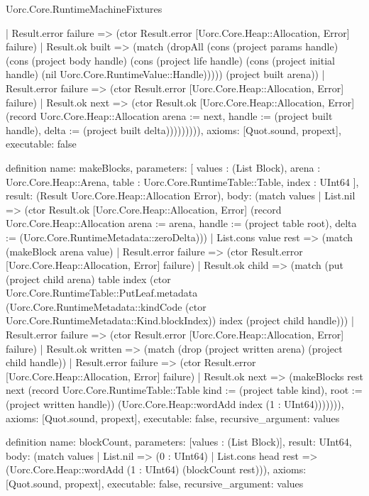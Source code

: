\begin{lexlean}{Uorc.Core.RuntimeMachineFixtures}
\begin{semanticmodule}
{            | Result.error failure => (ctor Result.error [Uorc.Core.Heap::Allocation, Error] failure)
            | Result.ok built => (match (dropAll (cons (project params handle) (cons (project body handle) (cons (project life handle) (cons (project initial handle) (nil Uorc.Core.RuntimeValue::Handle))))) (project built arena))
              | Result.error failure => (ctor Result.error [Uorc.Core.Heap::Allocation, Error] failure)
              | Result.ok next => (ctor Result.ok [Uorc.Core.Heap::Allocation, Error] (record Uorc.Core.Heap::Allocation {arena := next, handle := (project built handle), delta := (project built delta)})))))))),
  axioms: [Quot.sound, propext],
  executable: false
}

definition{
  name: makeBlocks,
  parameters: [
    values : (List Block),
    arena : Uorc.Core.Heap::Arena,
    table : Uorc.Core.RuntimeTable::Table,
    index : UInt64
  ],
  result: (Result Uorc.Core.Heap::Allocation Error),
  body: (match values
    | List.nil => (ctor Result.ok [Uorc.Core.Heap::Allocation, Error] (record Uorc.Core.Heap::Allocation {arena := arena, handle := (project table root), delta := (Uorc.Core.RuntimeMetadata::zeroDelta)}))
    | List.cons value rest => (match (makeBlock arena value)
      | Result.error failure => (ctor Result.error [Uorc.Core.Heap::Allocation, Error] failure)
      | Result.ok child => (match (put (project child arena) table index (ctor Uorc.Core.RuntimeTable::PutLeaf.metadata (Uorc.Core.RuntimeMetadata::kindCode (ctor Uorc.Core.RuntimeMetadata::Kind.blockIndex)) index (project child handle)))
        | Result.error failure => (ctor Result.error [Uorc.Core.Heap::Allocation, Error] failure)
        | Result.ok written => (match (drop (project written arena) (project child handle))
          | Result.error failure => (ctor Result.error [Uorc.Core.Heap::Allocation, Error] failure)
          | Result.ok next => (makeBlocks rest next (record Uorc.Core.RuntimeTable::Table {kind := (project table kind), root := (project written handle)}) (Uorc.Core.Heap::wordAdd index (1 : UInt64))))))),
  axioms: [Quot.sound, propext],
  executable: false,
  recursive_argument: values
}

definition{
  name: blockCount,
  parameters: [values : (List Block)],
  result: UInt64,
  body: (match values
    | List.nil => (0 : UInt64)
    | List.cons head rest => (Uorc.Core.Heap::wordAdd (1 : UInt64) (blockCount rest))),
  axioms: [Quot.sound, propext],
  executable: false,
  recursive_argument: values
}


\end{semanticmodule}
\end{lexlean}
